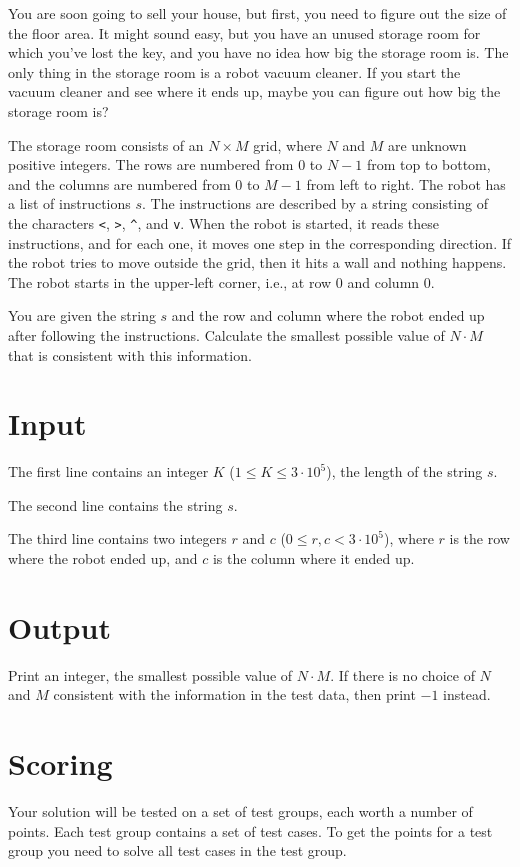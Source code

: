 \noindent
You are soon going to sell your house, but first, you need to figure out the size of the floor area. It might sound easy,
but you have an unused storage room for which you've lost the key, and you have no idea how big the storage room is.
The only thing in the storage room is a robot vacuum cleaner. If you start the vacuum cleaner and see where
it ends up, maybe you can figure out how big the storage room is?

The storage room consists of an $N \times M$ grid, where $N$ and $M$ are unknown positive integers. The rows are
numbered from $0$ to $N-1$ from top to bottom, and the columns are numbered from $0$ to $M-1$ from left to right.
The robot has a list of instructions $s$. The instructions are described by a string consisting of the characters \verb|<|, \verb|>|, \verb|^|, and \verb|v|.
When the robot is started, it reads these instructions, and for each one, it moves one step in the corresponding direction.
If the robot tries to move outside the grid, then it hits a wall and nothing happens.
The robot starts in the upper-left corner, i.e., at row $0$ and column $0$.

You are given the string $s$ and the row and column where the robot ended up after following the instructions.
Calculate the smallest possible value of $N \cdot M$ that is consistent with this information.

\section*{Input}
The first line contains an integer $K$ ($1 \leq K \leq 3 \cdot 10^5$), the length of the string $s$.

The second line contains the string $s$.

The third line contains two integers $r$ and $c$ ($0 \leq r,c < 3 \cdot 10^5$), where
$r$ is the row where the robot ended up, and $c$ is the column where it ended up.

\section*{Output}
Print an integer, the smallest possible value of $N \cdot M$. If there is no choice of $N$ and $M$ consistent
with the information in the test data, then print $-1$ instead.

\section*{Scoring}
Your solution will be tested on a set of test groups, each worth a number of points. Each test group contains
a set of test cases. To get the points for a test group you need to solve all test cases in the test group.

